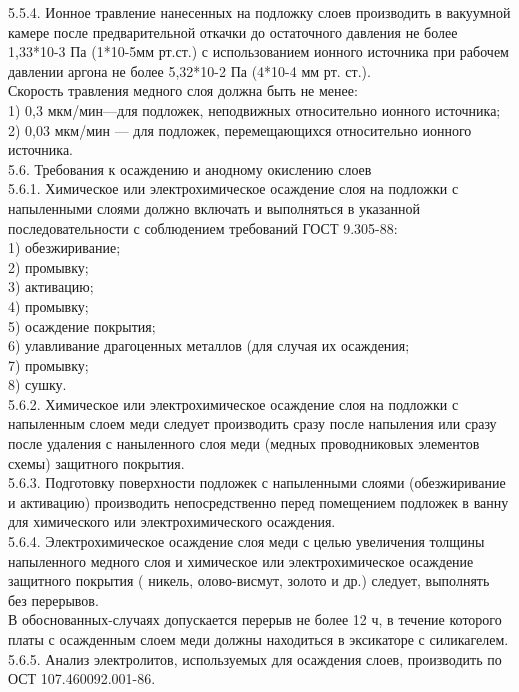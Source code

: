 \documentclass{bmstu}
\begin{document}
	5.5.4. Ионное травление нанесенных на подложку слоев производить в вакуумной камере после предварительной откачки до остаточного давления не более 1,33*10-3 Па (1*10-5мм рт.ст.) 
	с использованием ионного источника при рабочем давлении аргона не более 5,32*10-2  Па (4*10-4 мм рт. ст.). \\
	Скорость травления медного слоя должна быть не менее: \\
	1) 0,3 мкм/мин—для подложек, неподвижных относительно ионного источника; \\
	2) 0,03 мкм/мин — для подложек, перемещающихся относительно ионного источника. \\
	5.6. Требования к осаждению и анодному окислению слоев \\
	5.6.1. Химическое или электрохимическое осаждение слоя на подложки с напыленными слоями должно включать и выполняться в указанной последовательности с соблюдением требований ГОСТ 9.305-88: \\
	1) обезжиривание; \\
	2) промывку; \\
	3) активацию; \\
	4) промывку; \\
	5) осаждение покрытия; \\
	6) улавливание   драгоценных металлов (для случая их осаждения; \\
	7) промывку; \\
	8) сушку. \\
	5.6.2. Химическое или электрохимическое осаждение слоя на подложки с напыленным слоем меди следует производить сразу после напыления или сразу после удаления с наныленного слоя меди (медных проводниковых элементов схемы) защитного покрытия. \\
	5.6.3. Подготовку поверхности подложек с напыленными слоями (обезжиривание и активацию) производить непосредственно перед помещением подложек в ванну для химического или электрохимического осаждения. \\
	5.6.4. Электрохимическое осаждение слоя меди с целью увеличения толщины напыленного медного слоя и химическое или электрохимическое осаждение защитного покрытия ( никель, олово-висмут, золото и др.) следует, выполнять без перерывов. \\
	В обоснованных-случаях допускается перерыв не более 12 ч, в течение которого платы с осажденным слоем меди должны находиться в эксикаторе с силикагелем. \\
	5.6.5. Анализ электролитов, используемых для осаждения слоев, производить по ОСТ 107.460092.001-86. \\
\end{document}
